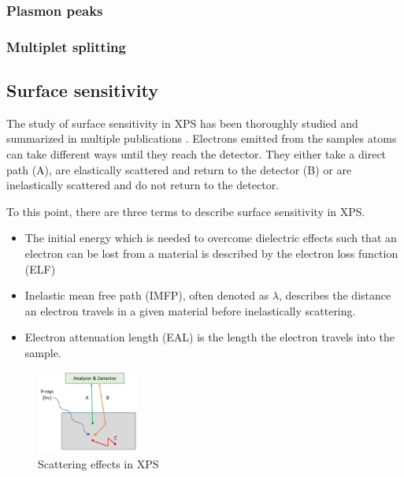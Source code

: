 \subsubsection{Plasmon peaks}


\subsubsection{Multiplet splitting}


\subsection{Surface sensitivity}

The study of surface sensitivity in XPS has been thoroughly studied and summarized in multiple publications \cite{powell_surface_2009, }. Electrons emitted from the samples atoms can take different ways until they reach the detector. They either take a direct path (A), are elastically scattered and return to the detector (B) or are inelastically scattered and do not return to the detector.




To this point, there are three terms to describe surface sensitivity in XPS.
\begin{itemize}
\item The initial energy which is needed to overcome dielectric effects such that an electron can be lost from a material is described by the electron loss function (ELF)
\item Inelastic mean free path (IMFP), often denoted as $\lambda$, describes the distance an electron travels in a given material before inelastically scattering.
\item Electron attenuation length (EAL) is the length the electron travels into the sample.

\end{itemize}

\begin{figure}
    \centering
    \includegraphics[width=0.3\textwidth]{Figures/image6_1.jpg}
    \caption{Scattering effects in XPS \cite{stevie_introduction_2020}}
    \label{fig:scattering}
\end{figure}

